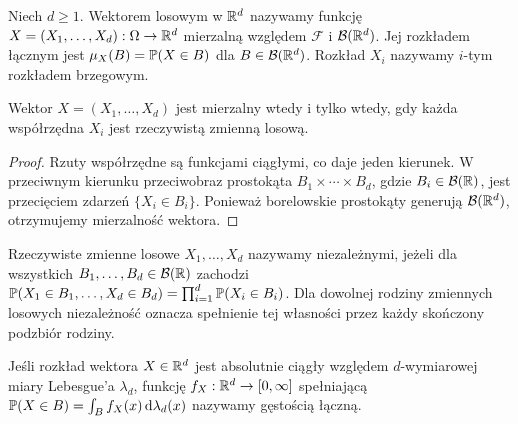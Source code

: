 \begin{definicja}
Niech $d\geq1$. Wektorem losowym w $\mathbb{R}^d$ nazywamy funkcję
$X=(X_1,\ldots,X_d):\Omega\to\mathbb{R}^d$ mierzalną względem
$\mathcal F$ i $\mathcal B(\mathbb{R}^d)$. Jej rozkładem łącznym jest
$\mu_X(B)=\mathbb{P}(X\in B)$ dla $B\in\mathcal B(\mathbb{R}^d)$.
Rozkład $X_i$ nazywamy $i$-tym rozkładem brzegowym.
\end{definicja}

\begin{stwierdzenie}
Wektor $X=(X_1,\ldots,X_d)$ jest mierzalny wtedy i tylko wtedy,
gdy każda współrzędna $X_i$ jest rzeczywistą zmienną losową.
\end{stwierdzenie}
\begin{proof}
Rzuty współrzędne są funkcjami ciągłymi, co daje jeden kierunek.
W przeciwnym kierunku przeciwobraz prostokąta
$B_1\times\cdots\times B_d$, gdzie $B_i\in\mathcal B(\mathbb{R})$,
jest przecięciem zdarzeń $\{X_i\in B_i\}$. Ponieważ
borelowskie prostokąty generują $\mathcal B(\mathbb{R}^d)$,
otrzymujemy mierzalność wektora.
\end{proof}

\begin{definicja}
Rzeczywiste zmienne losowe $X_1,\ldots,X_d$ nazywamy niezależnymi,
jeżeli dla wszystkich $B_1,\ldots,B_d\in\mathcal B(\mathbb{R})$ zachodzi
$\mathbb{P}(X_1\in B_1,\ldots,X_d\in B_d)=\prod_{i=1}^d\mathbb{P}(X_i\in B_i)$.
Dla dowolnej rodziny zmiennych losowych niezależność oznacza
spełnienie tej własności przez każdy skończony podzbiór rodziny.
\end{definicja}

\begin{definicja}
Jeśli rozkład wektora $X\in\mathbb{R}^d$ jest absolutnie ciągły względem
$d$-wymiarowej miary Lebesgue'a $\lambda_d$, funkcję
$f_X:\mathbb{R}^d\to[0,\infty]$ spełniającą
$\mathbb{P}(X\in B)=\int_B f_X(x)\,\mathrm{d}\lambda_d(x)$ nazywamy
gęstością łączną.
\end{definicja}

